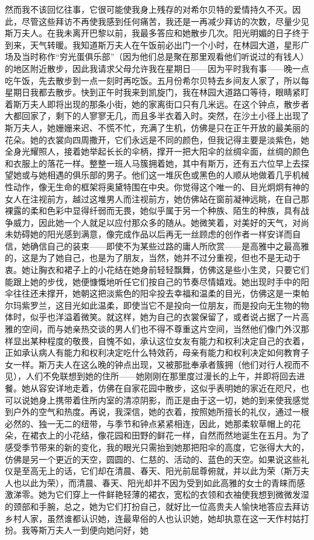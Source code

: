 \par 然而我不该回忆往事，它很可能使我身上残存的对希尔贝特的爱情持久不灭。因此，尽管这些拜访不再使我感到任何痛苦，我还是一再减少拜访的次数，尽量少见斯万夫人。在我未离开巴黎以前，我最多答应和她散步几次。阳光明媚的日子终于到来，天气转暖。我知道斯万夫人在午饭前必出门一个小时，在林园大道，星形广场及当时称作“穷光蛋俱乐部”（因为他们总是聚在那里观看他们听说过的有钱人）的地区附近散步，因此我请求父母允许我在星期日——因为平时我有事——晚一点吃午饭，先去散步到一点一刻时再吃饭。五月份希尔贝特去乡间友人家了，所以每星期日我都去散步。快到正午时我来到凯旋门，我在林园大道路口等待，眼睛紧盯着斯万夫人即将出现的那条小街，她的家离街口只有几米远。在这个钟点，散步者大都回家了，剩下的人寥寥无几，而且多半衣着入时。突然，在沙土小径上出现了斯万夫人，她姗姗来迟、不慌不忙，充满了生机，仿佛是只在正午开放的最美丽的花朵。她的衣裳向四周撒开，它们永远是不同的颜色，但我记得主要是淡紫色，她全身光耀照人，接着她举起长长的伞柄，撑开一把大阳伞的丝绸伞面，丝绸的颜色和衣服上的落花一样。整整一班人马簇拥着她，其中有斯万，还有五六位早上去探望她或与她相遇的俱乐部的男子。他们这一堆灰色或黑色的人顺从地做着几乎机械性动作，像无生命的框架将奥黛特围在中央。你觉得这个唯一的、目光炯炯有神的女人在注视前方，越过这堆男人而注视前方，她仿佛站在窗前凝神远眺，在自己那裸露的柔和色彩中显得纤弱而无畏，她似乎属于另一个种族、陌生的种族，具有战争威力，因此她一个人就足以应付那众多的随从。她微笑着，对美好的天气，对尚未妨碍她的阳光感到满意，像完成作品以后再无一丝顾虑的创作者一样安详而自信，她确信自己的装束——即使不为某些过路的庸人所欣赏——是高雅中之最高雅的，这是为了她自己，也是为了朋友，当然，她并不过分重视，但也不是无动于衷。她让胸衣和裙子上的小花结在她身前轻轻飘舞，仿佛这是些小生灵，只要它们能跟上她的步伐，她便慷慨地听任它们按自己的节奏尽情嬉戏。她出现时手中的阳伞往往还未撑开，她朝这把淡紫色的阳伞投去幸福和温柔的目光，仿佛这是一束帕尔玛紫罗兰，这目光如此温柔，即使当它不是投向一位朋友，而是投向无生物的物体时，似乎也洋溢着微笑。就这样，她为自己的衣裳保留了，或者说占据了一片高雅的空间，而与她亲热交谈的男人们也不得不尊重这片空间，当然他们像门外汉那样显出某种程度的敬畏，自愧不如，承认这位女友有能力和权利决定自己的衣着，正如承认病人有能力和权利决定吃什么特效药，母亲有能力和权利决定如何教育子女一样。斯万夫人在这么晚的钟点出现，又被那批奉承者簇拥（他们对行人视而不见），人们不免联想到她的住所——她刚刚在那里度过漫长的上午，并即将回去进餐。她从容安详地走着，仿佛在自家花园中散步，这似乎表明她的家近在咫尺，也可以说她身上携带着住所内室的清凉阴影，而正是由于这一切，她的到来使我感觉到户外的空气和热度。再说，我深信，她的衣着，按照她所擅长的礼仪，通过一根必然的、独一无二的纽带，与季节和钟点紧紧相连，因此，她那柔软草帽上的花朵，在裙衣上的小花结，像花园和田野的鲜花一样，自然而然地诞生在五月。为了感受季节带来的新的变化，我的眼光只需抬到她那把阳伞的高度，它张得大大的，仿佛是另一个更近的天空，圆圆的、仁慈的、活动的、蓝色的天空。如果说这些礼仪是至高无上的话，它们却在清晨、春天、阳光前屈尊俯就，并以此为荣（斯万夫人也以此为荣），而清晨、春天、阳光却并不因为受到如此高雅的女士的青睐而感激涕零。她为它们穿上一件鲜艳轻薄的裙衣，宽松的衣领和衣袖使我想到微微发湿的颈部和手腕，总之，她为它们打扮自己，就好比一位高贵夫人愉快地答应去拜访乡村人家，虽然谁都认识她，连最卑俗的人也认识她，她却执意在这一天作村姑打扮。我等斯万夫人一到便向她问好，她